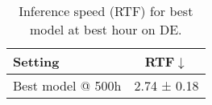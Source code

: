 \begin{table}[htbp!]
\centering
\small
\begin{tabular}{lc}
\toprule
Setting & RTF$\downarrow$ \\
\midrule
Best model @ 500h & 2.74 ± 0.18 \\
\bottomrule
\end{tabular}
\caption{Inference speed (RTF) for best model at best hour on DE.}
\label{tab:speed-best-de}
\end{table}
